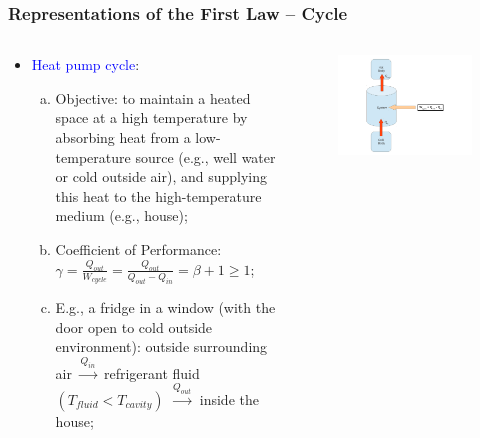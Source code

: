 \documentclass[10pt,compress]{beamer}
\begin{document}
\begin{frame}
 \frametitle{Representations of the First Law -- Cycle}
 \begin{columns}
  \begin{column}[l]{0.5\linewidth}
   \begin{itemize}
    \item <1-> \textcolor{blue}{Heat pump cycle}:
     \begin{enumerate}[(a)]
      \item <2-> Objective: to maintain a heated space at a high temperature by absorbing heat from a low-temperature source (e.g., well water or cold outside air), and supplying this heat to the high-temperature medium (e.g., house);
      \item <3-> Coefficient of Performance: $\gamma = \displaystyle\frac{Q_{out}}{W_{cycle}} = \displaystyle\frac{Q_{out}}{Q_{out} - Q_{in}} = \beta + 1 \geq 1$;
      \item <4-> E.g., a fridge in a window (with the door open to cold outside environment): outside surrounding air $\xrightarrow{Q_{in}}$ refrigerant fluid $\left(T_{fluid} < T_{cavity}\right)$ $\xrightarrow{Q_{out}}$ inside the house; 
     \end{enumerate}
   \end{itemize}
  \end{column}
   
  \begin{column}[c]{0.5\linewidth}
   \begin{figure}%
    \begin{center}
     \includegraphics[width=8.cm,clip]{./Pics/FirstLaw_Cycle_02}
    \end{center}
   \end{figure}    
  \end{column}
 \end{columns}
 \normalsize
\end{frame}
\end{document}
